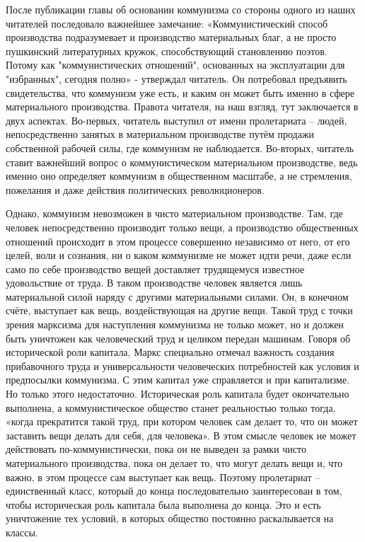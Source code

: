 \documentclass[../main]{subfiles}
\begin{document}
После публикации главы об основании коммунизма со стороны одного из наших читателей последовало важнейшее замечание: «Коммунистический способ производства подразумевает и производство материальных благ, а не просто пушкинский литературных кружок, способствующий становлению поэтов. Потому как "коммунистических отношений", основанных на эксплуатации для "избранных", сегодня полно» - утверждал читатель. Он потребовал предъявить свидетельства, что коммунизм уже есть, и каким он может быть именно в сфере материального производства. Правота читателя, на наш взгляд, тут заключается в двух аспектах. Во-первых, читатель выступил от имени пролетариата – людей, непосредственно занятых в материальном производстве путём продажи собственной рабочей силы, где коммунизм не наблюдается. Во-вторых, читатель ставит важнейший вопрос о коммунистическом материальном производстве, ведь именно оно определяет коммунизм в общественном масштабе, а не стремления, пожелания и даже действия политических революционеров.

Однако, коммунизм невозможен в чисто материальном производстве. Там, где человек непосредственно производит только вещи, а производство общественных отношений происходит в этом процессе совершенно независимо от него, от его целей, воли и сознания, ни о каком коммунизме не может идти речи, даже если само по себе производство вещей доставляет трудящемуся известное удовольствие от труда. В таком производстве человек является лишь материальной силой наряду с другими материальными силами. Он, в конечном счёте, выступает как вещь, воздействующая на другие вещи. Такой труд с точки зрения марксизма для наступления коммунизма не только может, но и должен быть уничтожен как человеческий труд и целиком передан машинам. Говоря об исторической роли капитала, Маркс специально отмечал важность создания прибавочного труда и универсальности человеческих потребностей как условия и предпосылки коммунизма. С этим капитал уже справляется и при капитализме. Но только этого недостаточно. Историческая роль капитала будет окончательно выполнена, а коммунистическое общество станет реальностью только тогда, «когда прекратится такой труд, при котором человек сам делает то, что он может заставить вещи делать для себя, для человека». В этом смысле человек не может действовать по-коммунистически, пока он не выведен за рамки чисто материального производства, пока он делает то, что могут делать вещи и, что важно, в этом процессе сам выступает как вещь. Поэтому пролетариат – единственный класс, который до конца последовательно заинтересован в том, чтобы историческая роль капитала была выполнена до конца. Это и есть уничтожение тех условий, в которых общество постоянно раскалывается на классы.
\end{document}
